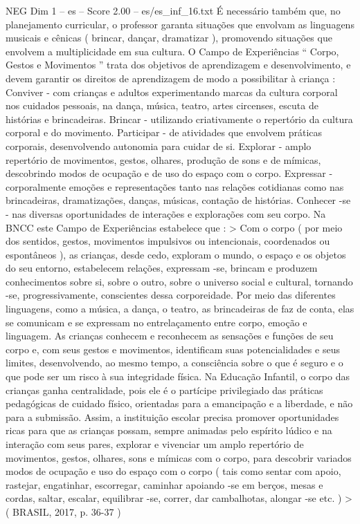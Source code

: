 \begin{textsample}{NEG Dim 1 – es – Score 2.00 – es/es\_inf\_16.txt}
É necessário também que, no planejamento curricular, o professor garanta situações que envolvam as linguagens musicais e cênicas ( brincar, dançar, dramatizar ), promovendo situações que envolvem a multiplicidade em sua cultura.
O Campo de Experiências “ Corpo, Gestos e Movimentos ” trata dos objetivos de aprendizagem e desenvolvimento, e devem garantir os direitos de aprendizagem de modo a possibilitar à criança : Conviver - com crianças e adultos experimentando marcas da cultura corporal nos cuidados pessoais, na dança, música, teatro, artes circenses, escuta de histórias e brincadeiras.
Brincar - utilizando criativamente o repertório da cultura corporal e do movimento.
Participar - de atividades que envolvem práticas corporais, desenvolvendo autonomia para cuidar de si.
Explorar - amplo repertório de movimentos, gestos, olhares, produção de sons e de mímicas, descobrindo modos de ocupação e de uso do espaço com o corpo.
Expressar - corporalmente emoções e representações tanto nas relações cotidianas como nas brincadeiras, dramatizações, danças, músicas, contação de histórias.
Conhecer -se - nas diversas oportunidades de interações e explorações com seu corpo.
Na BNCC este Campo de Experiências estabelece que : > Com o corpo ( por meio dos sentidos, gestos, movimentos impulsivos ou intencionais, coordenados ou espontâneos ), as crianças, desde cedo, exploram o mundo, o espaço e os objetos do seu entorno, estabelecem relações, expressam -se, brincam e produzem conhecimentos sobre si, sobre o outro, sobre o universo social e cultural, tornando -se, progressivamente, conscientes dessa corporeidade.
Por meio das diferentes linguagens, como a música, a dança, o teatro, as brincadeiras de faz de conta, elas se comunicam e se expressam no entrelaçamento entre corpo, emoção e linguagem.
As crianças conhecem e reconhecem as sensações e funções de seu corpo e, com seus gestos e movimentos, identificam suas potencialidades e seus limites, desenvolvendo, ao mesmo tempo, a consciência sobre o que é seguro e o que pode ser um risco à sua integridade física.
Na Educação Infantil, o corpo das crianças ganha centralidade, pois ele é o partícipe privilegiado das práticas pedagógicas de cuidado físico, orientadas para a emancipação e a liberdade, e não para a submissão.
Assim, a instituição escolar precisa promover oportunidades ricas para que as crianças possam, sempre animadas pelo espírito lúdico e na interação com seus pares, explorar e vivenciar um amplo repertório de movimentos, gestos, olhares, sons e mímicas com o corpo, para descobrir variados modos de ocupação e uso do espaço com o corpo ( tais como sentar com apoio, rastejar, engatinhar, escorregar, caminhar apoiando -se em berços, mesas e cordas, saltar, escalar, equilibrar -se, correr, dar cambalhotas, alongar -se etc. ) > ( BRASIL, 2017, p. 36-37 )

\end{textsample}

